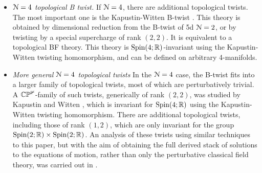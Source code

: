 \documentclass[10pt, oneside]{article}
\begin{document}
\begin{itemize}
 \item \emph{$\mathcal{N}=4$ topological B twist.} If $\mathcal{N}=4$, there are additional topological twists.  The most important one is the Kapustin-Witten B-twist \cite{KapustinWitten}.  This theory is obtained by dimensional reduction from the B-twist of 5d $\mathcal{N}=2$, or by twisting by a special supercharge of rank $(2,2)$.  It is equivalent to a topological BF theory.  This theory is $\mathrm{Spin}(4;\mathbb R)$-invariant using the Kapustin-Witten twisting homomorphism, and can be defined on arbitrary 4-manifolds.
 \item \emph{More general $\mathcal{N}=4$ topological twists} In the $\mathcal{N}=4$ case, the B-twist fits into a larger family of topological twists, most of which are perturbatively trivial.  A $\mathbb{CP^1}$-family of such twists, generically of rank $(2,2)$, was studied by Kapustin and Witten \cite{KapustinWitten}, which is invariant for $\mathrm{Spin}(4;\mathbb R)$ using the Kapustin-Witten twisting homomorphism.  There are additional topological twists, including those of rank $(1,2)$, which are only invariant for the group $\mathrm{Spin}(2;\mathbb R) \times \mathrm{Spin}(2;\mathbb R)$.  An analysis of these twists using similar techniques to this paper, but with the aim of obtaining the full derived stack of solutions to the equations of motion, rather than only the perturbative classical field theory, was carried out in \cite{ElliottYoo1}.
\end{itemize}
\end{document}
